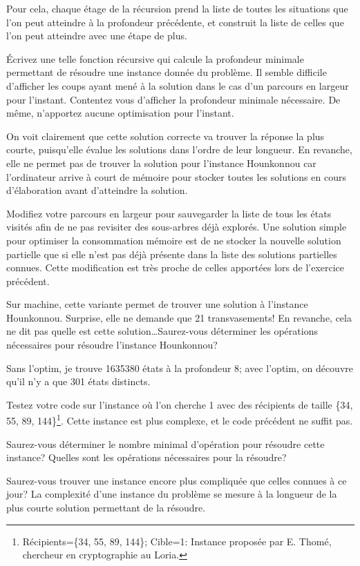 \documentclass[10pt]{article}\usepackage[correction,nu]{esial}%
\begin{document}
\begin{Exercice}
Pour cela, chaque étage de la récursion prend la liste de toutes les situations
que l'on peut atteindre à la profondeur précédente, et construit la liste de
celles que l'on peut atteindre avec une étape de plus.

\Question Écrivez une telle fonction récursive qui calcule la profondeur
minimale permettant de résoudre une instance donnée du problème. Il semble
difficile d'afficher les coups ayant mené à la solution dans le cas d'un
parcours en largeur pour l'instant. Contentez vous d'afficher la profondeur
minimale nécessaire. De même, n'apportez aucune optimisation pour l'instant.

\begin{Reponse}
  \newcommand*\FancyVerbStartString{// BEGIN CHERCHE}
  \newcommand*\FancyVerbStopString{// END CHERCHE}
\end{Reponse}

\Question %
On voit clairement que cette solution correcte va trouver la réponse la plus
courte, puisqu'elle évalue les solutions dans l'ordre de leur longueur. En
revanche, elle ne permet pas de trouver la solution pour l'instance Hounkonnou
car l'ordinateur arrive à court de mémoire pour stocker toutes les solutions en
cours d'élaboration avant d'atteindre la solution.

\Question %
Modifiez votre parcours en largeur pour sauvegarder la liste de tous les états
visités afin de ne pas revisiter des sous-arbres déjà explorés. 
Une solution simple pour optimiser la consommation mémoire est de ne stocker la
nouvelle solution partielle que si elle n'est pas déjà présente dans la liste
des solutions partielles connues. Cette modification est très proche de celles
apportées lors de l'exercice précédent.

Sur machine, cette variante permet de trouver une solution à l'instance
Hounkonnou. Surprise, elle ne demande que 21 transvasements! En revanche, cela
ne dit pas quelle est cette solution\ldots Saurez-vous déterminer les opérations
nécessaires pour résoudre l'instance Hounkonnou?

\begin{Reponse}
  Sans l'optim, je trouve 1635380 états à la profondeur 8; avec l'optim, on
  découvre qu'il n'y a que 301 états distincts.
\end{Reponse}

\Question %
Testez votre code sur l'instance où l'on cherche 1 avec des récipients de taille
\{34, 55, 89, 144\}\footnote{Récipients=\{34, 55, 89, 144\}; Cible=1: Instance
  proposée par E. Thomé, chercheur en cryptographie au Loria.}. Cette instance
est plus complexe, et le code précédent ne suffit pas.

Saurez-vous déterminer le nombre minimal d'opération pour résoudre cette
instance? Quelles sont les opérations nécessaires pour la résoudre?

\Question %
Saurez-vous trouver une instance encore plus compliquée que celles connues à ce
jour? La complexité d'une instance du problème se mesure à la longueur de la
plus courte solution permettant de la résoudre.
\end{Exercice}
\end{document}
